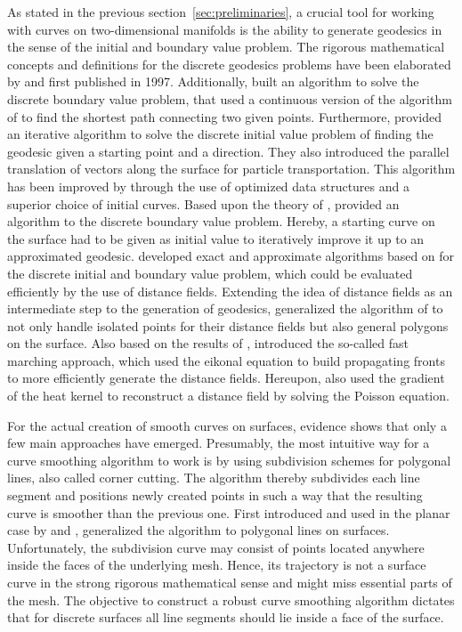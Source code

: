 \documentclass{stdlocal}
\begin{document}
As stated in the previous section~\ref{sec:preliminaries}, a crucial tool for working with curves on two-dimensional manifolds is the ability to generate geodesics in the sense of the initial and boundary value problem.
The rigorous mathematical concepts and definitions for the discrete geodesics problems have been elaborated by \textcite{mitchell1987} and \textcite{polthier2006} first published in 1997.
Additionally, \textcite{mitchell1987} built an algorithm to solve the discrete boundary value problem, that used a continuous version of the algorithm of \textcite{dijkstra1959} to find the shortest path connecting two given points.
Furthermore, \textcite{polthier2006} provided an iterative algorithm to solve the discrete initial value problem of finding the geodesic given a starting point and a direction.
They also introduced the parallel translation of vectors along the surface for particle transportation.
This algorithm has been improved by \textcite{mancinelli2022} through the use of optimized data structures and a superior choice of initial curves.
Based upon the theory of \textcite{polthier2006}, \textcite{martinez2005} provided an algorithm to the discrete boundary value problem.
Hereby, a starting curve on the surface had to be given as initial value to iteratively improve it up to an approximated geodesic.
\textcite{surazhsky2005} developed exact and approximate algorithms based on \textcite{mitchell1987} for the discrete initial and boundary value problem, which could be evaluated efficiently by the use of distance fields.
Extending the idea of distance fields as an intermediate step to the generation of geodesics, \textcite{bommes2007} generalized the algorithm of \textcite{surazhsky2005} to not only handle isolated points for their distance fields but also general polygons on the surface.
Also based on the results of \textcite{mitchell1987}, \textcite{kimmel1996} introduced the so-called fast marching approach, which used the eikonal equation to build propagating fronts to more efficiently generate the distance fields.
Hereupon, \textcite{crane2013} also used the gradient of the heat kernel to reconstruct a distance field by solving the Poisson equation.

For the actual creation of smooth curves on surfaces, evidence shows that only a few main approaches have emerged.
Presumably, the most intuitive way for a curve smoothing algorithm to work is by using subdivision schemes for polygonal lines, also called corner cutting.
The algorithm thereby subdivides each line segment and positions newly created points in such a way that the resulting curve is smoother than the previous one.
First introduced and used in the planar case by \textcite{chaikin1974} and \textcite{dyn1992}, \textcite{morera2008} generalized the algorithm to polygonal lines on surfaces.
Unfortunately, the subdivision curve may consist of points located anywhere inside the faces of the underlying mesh.
Hence, its trajectory is not a surface curve in the strong rigorous mathematical sense and might miss essential parts of the mesh.
The objective to construct a robust curve smoothing algorithm dictates that for discrete surfaces all line segments should lie inside a face of the surface.
\end{document}
